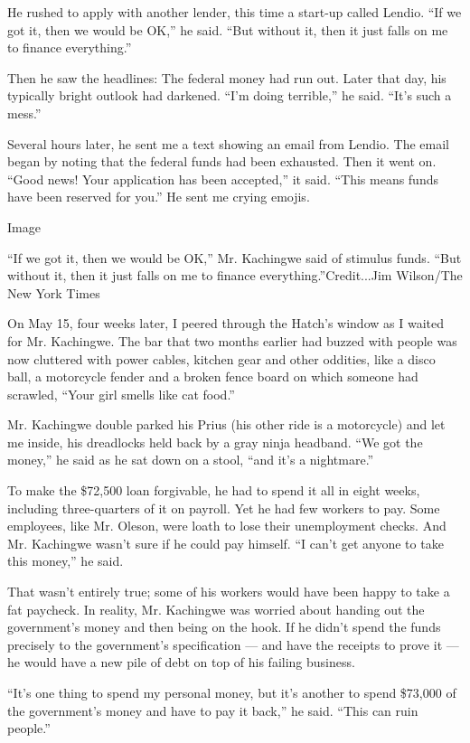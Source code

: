 He rushed to apply with another lender, this time a start-up called
Lendio. ``If we got it, then we would be OK,'' he said. ``But without
it, then it just falls on me to finance everything.''

Then he saw the headlines: The federal money had run out. Later that
day, his typically bright outlook had darkened. ``I'm doing terrible,''
he said. ``It's such a mess.''

Several hours later, he sent me a text showing an email from Lendio. The
email began by noting that the federal funds had been exhausted. Then it
went on. ``Good news! Your application has been accepted,'' it said.
``This means funds have been reserved for you.'' He sent me crying
emojis.

Image

``If we got it, then we would be OK,'' Mr. Kachingwe said of stimulus
funds. ``But without it, then it just falls on me to finance
everything.''Credit...Jim Wilson/The New York Times

On May 15, four weeks later, I peered through the Hatch's window as I
waited for Mr. Kachingwe. The bar that two months earlier had buzzed
with people was now cluttered with power cables, kitchen gear and other
oddities, like a disco ball, a motorcycle fender and a broken fence
board on which someone had scrawled, ``Your girl smells like cat food.''

Mr. Kachingwe double parked his Prius (his other ride is a motorcycle)
and let me inside, his dreadlocks held back by a gray ninja headband.
``We got the money,'' he said as he sat down on a stool, ``and it's a
nightmare.''

To make the \$72,500 loan forgivable, he had to spend it all in eight
weeks, including three-quarters of it on payroll. Yet he had few workers
to pay. Some employees, like Mr. Oleson, were loath to lose their
unemployment checks. And Mr. Kachingwe wasn't sure if he could pay
himself. ``I can't get anyone to take this money,'' he said.

That wasn't entirely true; some of his workers would have been happy to
take a fat paycheck. In reality, Mr. Kachingwe was worried about handing
out the government's money and then being on the hook. If he didn't
spend the funds precisely to the government's specification --- and have
the receipts to prove it --- he would have a new pile of debt on top of
his failing business.

``It's one thing to spend my personal money, but it's another to spend
\$73,000 of the government's money and have to pay it back,'' he said.
``This can ruin people.''

